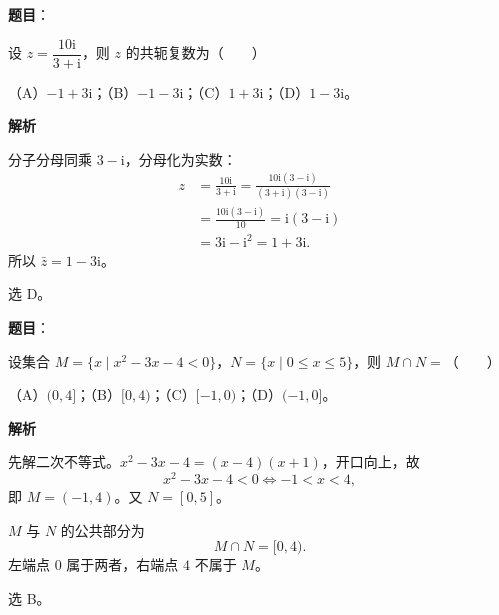 

\begin{answer}

\textbf{题目}：

设 $z=\dfrac{10\mathrm i}{3+\mathrm i}$，则 $z$ 的共轭复数为\mbox{（　　）}

（A）$-1+3\mathrm i$；（B）$-1-3\mathrm i$；（C）$1+3\mathrm i$；（D）$1-3\mathrm i$。

\textbf{解析}

分子分母同乘 $3-\mathrm i$，分母化为实数：
\nopagebreak[4]
\[\begin{aligned}
z&=\frac{10\mathrm i}{3+\mathrm i}
=\frac{10\mathrm i(3-\mathrm i)}{(3+\mathrm i)(3-\mathrm i)}\\
&=\frac{10\mathrm i(3-\mathrm i)}{10}
=\mathrm i(3-\mathrm i)\\
&=3\mathrm i-\mathrm i^2=1+3\mathrm i.
\end{aligned}\]
所以 $\bar z=1-3\mathrm i$。

选 D。


\end{answer}
\begin{answer}

\textbf{题目}：

设集合 $M=\{x\mid x^2-3x-4<0\}$，$N=\{x\mid 0\leqslant x\leqslant 5\}$，则 $M\cap N=$\mbox{（　　）}

（A）$(0,4]$；（B）$[0,4)$；（C）$[-1,0)$；（D）$(-1,0]$。

\textbf{解析}

先解二次不等式。$x^2-3x-4=(x-4)(x+1)$，开口向上，故
\nopagebreak[4]
\[x^2-3x-4<0\iff -1<x<4,\]
即 $M=(-1,4)$。又 $N=[0,5]$。

$M$ 与 $N$ 的公共部分为
\nopagebreak[4]
\[M\cap N=[0,4).\]
左端点 $0$ 属于两者，右端点 $4$ 不属于 $M$。

选 B。

\gkanswer{答案：B。$M=(-1,4)$，$N=[0,5]$，故 $M\cap N=[0,4)$。}

\end{answer}
